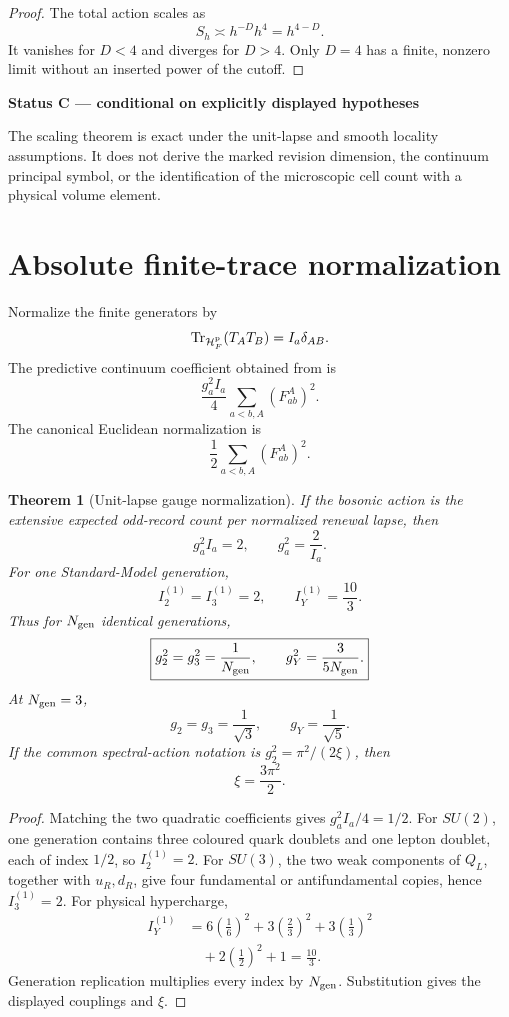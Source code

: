\documentclass[11pt,oneside,openany]{book}
\numberwithin{equation}{chapter}
\newtheorem{theorem}{Theorem}[chapter]
\theoremstyle{definition}
\theoremstyle{remark}
\newcommand{\Tr}{\operatorname{Tr}}
\newcommand{\HF}{\mathcal H_F}
\newenvironment{statusbox}[2]{%
  \par\medskip\noindent
  \begin{center}\begin{minipage}{0.94\textwidth}
  \colorbox{#1!8}{\parbox{\dimexpr\linewidth-2\fboxsep\relax}{\textbf{#2}}}\par\smallskip
}{%
  \end{minipage}\end{center}\medskip
}
\newcommand{\Conditional}[1]{\begin{statusbox}{CondColor}{Status C --- conditional on explicitly displayed hypotheses}#1\end{statusbox}}
\begin{document}
\begin{proof}
The total action scales as
\[
 S_h\asymp h^{-D}h^4=h^{4-D}.
\]
It vanishes for \(D<4\) and diverges for \(D>4\).  Only \(D=4\) has a finite,
nonzero limit without an inserted power of the cutoff.
\end{proof}

\Conditional{The scaling theorem is exact under the unit-lapse and smooth
locality assumptions.  It does not derive the marked revision dimension,
the continuum principal symbol, or the identification of the microscopic
cell count with a physical volume element.}

\section{Absolute finite-trace normalization}

Normalize the finite generators by
\[
 \Tr_{\HF^{\rm p}}(T_AT_B)=I_a\delta_{AB}.
\]
The predictive continuum coefficient obtained from
 is
\[
 \frac{g_a^2I_a}{4}
 \sum_{a<b,A}(F_{ab}^A)^2.
\]
The canonical Euclidean normalization is
\[
 \frac12\sum_{a<b,A}(F_{ab}^A)^2.
\]

\begin{theorem}[Unit-lapse gauge normalization]
\label{thm:absolute-gauge-normalization}
If the bosonic action is the extensive expected odd-record count per
normalized renewal lapse, then
\[
 \boxed{
 g_a^2I_a=2,
 \qquad
 g_a^2=\frac2{I_a}.}
\]
For one Standard-Model generation,
\[
 I_2^{(1)}=I_3^{(1)}=2,
 \qquad
 I_Y^{(1)}=\frac{10}{3}.
\]
Thus for \(N_{\rm gen}\) identical generations,
\[
 \boxed{
 g_2^2=g_3^2=\frac1{N_{\rm gen}},
 \qquad
 g_Y^2=\frac3{5N_{\rm gen}}.}
\]
At \(N_{\rm gen}=3\),
\[
 \boxed{
 g_2=g_3=\frac1{\sqrt3},
 \qquad
 g_Y=\frac1{\sqrt5}.}
\]
If the common spectral-action notation is
\(g_2^2=\pi^2/(2\xi)\), then
\[
 \boxed{\xi=\frac{3\pi^2}{2}.}
\]
\end{theorem}

\begin{proof}
Matching the two quadratic coefficients gives \(g_a^2I_a/4=1/2\).
For \(SU(2)\), one generation contains three coloured quark doublets and one
lepton doublet, each of index \(1/2\), so \(I_2^{(1)}=2\).  For \(SU(3)\),
the two weak components of \(Q_L\), together with \(u_R,d_R\), give four
fundamental or antifundamental copies, hence \(I_3^{(1)}=2\).  For physical
hypercharge,
\[
 \begin{aligned}
 I_Y^{(1)}
 &=
 6\left(\frac16\right)^2
 +3\left(\frac23\right)^2
 +3\left(\frac13\right)^2\\
 &\quad
 +2\left(\frac12\right)^2
 +1
 =\frac{10}{3}.
 \end{aligned}
\]
Generation replication multiplies every index by \(N_{\rm gen}\).
Substitution gives the displayed couplings and \(\xi\).
\end{proof}
\end{document}
